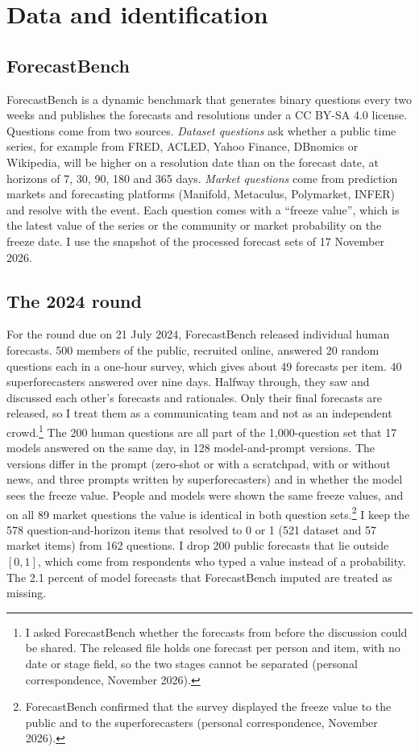 \documentclass[11pt,a4paper]{article}
\theoremstyle{definition}
\begin{document}
\section{Data and identification}\label{sec:data}

\subsection{ForecastBench}

ForecastBench \citep{karger2025forecastbench} is a dynamic benchmark that generates binary questions every two weeks and publishes the forecasts and resolutions under a CC BY-SA 4.0 license. Questions come from two sources. \emph{Dataset questions} ask whether a public time series, for example from FRED, ACLED, Yahoo Finance, DBnomics or Wikipedia, will be higher on a resolution date than on the forecast date, at horizons of 7, 30, 90, 180 and 365 days. \emph{Market questions} come from prediction markets and forecasting platforms (Manifold, Metaculus, Polymarket, INFER) and resolve with the event. Each question comes with a ``freeze value'', which is the latest value of the series or the community or market probability on the freeze date. I use the snapshot of the processed forecast sets of 17 November 2026.

\subsection{The 2024 round}

For the round due on 21 July 2024, ForecastBench released individual human forecasts. 500 members of the public, recruited online, answered 20 random questions each in a one-hour survey, which gives about 49 forecasts per item. 40 superforecasters answered over nine days. Halfway through, they saw and discussed each other's forecasts and rationales. Only their final forecasts are released, so I treat them as a communicating team and not as an independent crowd.\footnote{I asked ForecastBench whether the forecasts from before the discussion could be shared. The released file holds one forecast per person and item, with no date or stage field, so the two stages cannot be separated (personal correspondence, November 2026).} The 200 human questions are all part of the 1,000-question set that 17 models answered on the same day, in 128 model-and-prompt versions. The versions differ in the prompt (zero-shot or with a scratchpad, with or without news, and three prompts written by superforecasters) and in whether the model sees the freeze value. People and models were shown the same freeze values, and on all 89 market questions the value is identical in both question sets.\footnote{ForecastBench confirmed that the survey displayed the freeze value to the public and to the superforecasters (personal correspondence, November 2026).} I keep the 578 question-and-horizon items that resolved to 0 or 1 (521 dataset and 57 market items) from 162 questions. I drop 200 public forecasts that lie outside $[0,1]$, which come from respondents who typed a value instead of a probability. The 2.1 percent of model forecasts that ForecastBench imputed are treated as missing.
\end{document}
